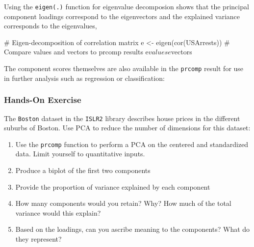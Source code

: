 \noindent Using the \texttt{eigen(.)} function for eigenvalue decomposion shows that the principal component loadings correspond to the eigenvectors and the explained variance corresponds to the eigenvalues, 

\begin{samepage}
\begin{Rcode}
# Eigen-decomposition of correlation matrix
e <- eigen(cor(USArrests))
# Compare values and vectors to prcomp results
e$values
e$vectors
\end{Rcode}
\end{samepage}


\noindent The component scores themselves are also available in the \texttt{prcomp} result for use in further analysis such as regression or classification:

\begin{samepage}
\end{samepage}

\begin{tcolorbox}[colback=code]
\subsubsection*{Hands-On Exercise} 
The \texttt{Boston} dataset in the \texttt{ISLR2} library describes house prices in the different suburbs of Boston. Use PCA to reduce the number of dimensions for this dataset:
\begin{enumerate}
   \item Use the \texttt{prcomp} function to perform a PCA on the centered and standardized data. Limit yourself to quantitative inputs.
   \item Produce a biplot of the first two components
   \item Provide the proportion of variance explained by each component
   \item How many components would you retain? Why? How much of the total variance would this explain?
   \item Based on the loadings, can you ascribe meaning to the components? What do they represent?
\end{enumerate}
\end{tcolorbox}

